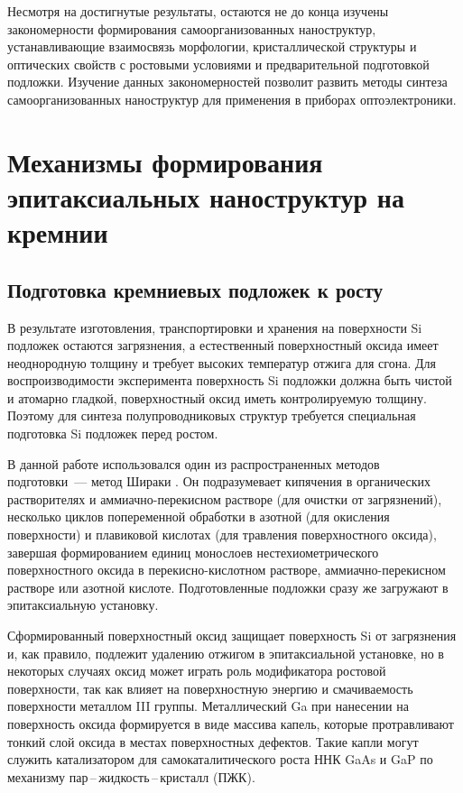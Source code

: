 Несмотря на достигнутые результаты, остаются не до конца изучены закономерности
формирования самоорганизованных наноструктур, устанавливающие взаимосвязь
морфологии, кристаллической структуры и оптических свойств с ростовыми
условиями и предварительной подготовкой подложки. Изучение данных
закономерностей позволит развить методы синтеза самоорганизованных наноструктур
для применения в приборах оптоэлектроники.

\section{Механизмы формирования эпитаксиальных наноструктур на
кремнии}\label{sec:ch1/sec2}

\subsection{Подготовка кремниевых подложек к росту}\label{subsec:ch1/sec2/sub1}

В результате изготовления, транспортировки и хранения на поверхности Si
подложек остаются загрязнения, а естественный поверхностный оксида имеет
неоднородную толщину и требует высоких температур отжига для сгона. Для
воспроизводимости эксперимента поверхность Si подложки должна быть чистой и
атомарно гладкой, поверхностный оксид иметь контролируемую толщину. Поэтому для
синтеза полупроводниковых структур требуется специальная подготовка Si подложек
перед ростом.

В данной работе использовался один из распространенных методов подготовки~---
метод Шираки \cite{Ishizaka2019}. Он подразумевает кипячения в органических
растворителях и аммиачно-перекисном растворе (для очистки от загрязнений),
несколько циклов попеременной обработки в азотной (для окисления поверхности) и
плавиковой кислотах (для травления поверхностного оксида), завершая
формированием единиц монослоев нестехиометрического поверхностного оксида в
перекисно-кислотном растворе, аммиачно-перекисном растворе или азотной кислоте.
Подготовленные подложки сразу же загружают в эпитаксиальную установку.

Сформированный поверхностный оксид защищает поверхность Si от загрязнения и,
как правило, подлежит удалению отжигом в эпитаксиальной установке, но в
некоторых случаях оксид может играть роль модификатора ростовой поверхности,
так как влияет на поверхностную энергию и смачиваемость поверхности металлом
III группы. Металлический Ga при нанесении на поверхность оксида формируется в
виде массива капель, которые протравливают тонкий слой оксида в местах
поверхностных дефектов. Такие капли могут служить катализатором для
самокаталитического роста ННК GaAs и GaP по механизму
пар\,--\,жидкость\,--\,кристалл (ПЖК).

